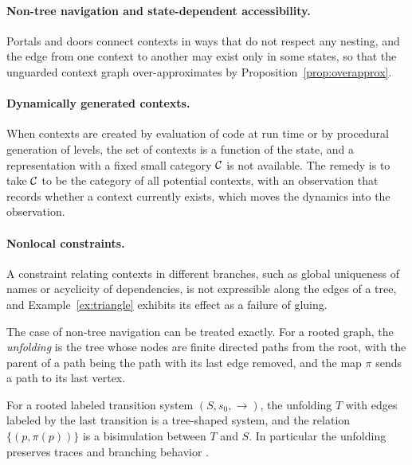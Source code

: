 \paragraph{Non-tree navigation and state-dependent accessibility.} Portals and doors connect contexts in ways that do not respect any nesting, and the edge from one context to another may exist only in some states, so that the unguarded context graph over-approximates by Proposition~\ref{prop:overapprox}.

\paragraph{Dynamically generated contexts.} When contexts are created by evaluation of code at run time or by procedural generation of levels, the set of contexts is a function of the state, and a representation with a fixed small category $\mathcal C$ is not available. The remedy is to take $\mathcal C$ to be the category of all potential contexts, with an observation that records whether a context currently exists, which moves the dynamics into the observation.

\paragraph{Nonlocal constraints.} A constraint relating contexts in different branches, such as global uniqueness of names or acyclicity of dependencies, is not expressible along the edges of a tree, and Example~\ref{ex:triangle} exhibits its effect as a failure of gluing.

The case of non-tree navigation can be treated exactly. For a rooted graph, the \emph{unfolding} is the tree whose nodes are finite directed paths from the root, with the parent of a path being the path with its last edge removed, and the map $\pi$ sends a path to its last vertex.

\begin{proposition}\label{prop:unfold}
For a rooted labeled transition system $(S,s_0,\to)$, the unfolding $T$ with edges labeled by the last transition is a tree-shaped system, and the relation $\{(p,\pi(p))\}$ is a bisimulation between $T$ and $S$. In particular the unfolding preserves traces and branching behavior \cite{sangiorgi}.
\end{proposition}


